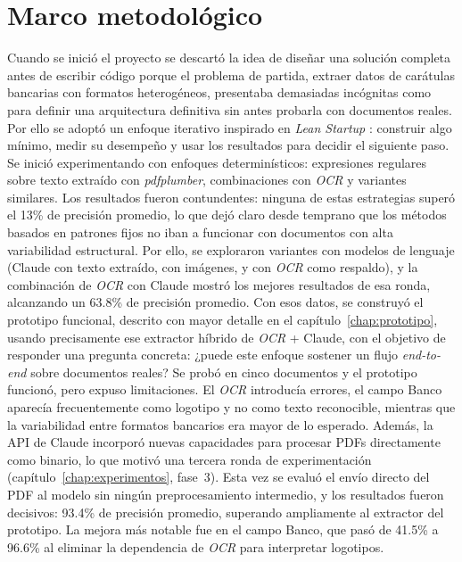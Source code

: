 \chapter{Marco metodológico}\label{chap:marco}

Cuando se inició el proyecto se descartó la idea de diseñar una solución completa antes de escribir código porque el problema de partida, extraer datos de carátulas bancarias con formatos heterogéneos, presentaba demasiadas incógnitas como para definir una arquitectura definitiva sin antes probarla con documentos reales. Por ello se adoptó un enfoque iterativo inspirado en \textit{Lean Startup} \cite{ries_lean_startup}: construir algo mínimo, medir su desempeño y usar los resultados para decidir el siguiente paso. Se inició experimentando con enfoques determinísticos: expresiones regulares sobre texto extraído con \textit{pdfplumber}, combinaciones con \textit{OCR} y variantes similares. Los resultados fueron contundentes: ninguna de estas estrategias superó el 13\% de precisión promedio, lo que dejó claro desde temprano que los métodos basados en patrones fijos no iban a funcionar con documentos con alta variabilidad estructural. Por ello, se exploraron variantes con modelos de lenguaje (Claude con texto extraído, con imágenes, y con \textit{OCR} como respaldo), y la combinación de \textit{OCR} con Claude mostró los mejores resultados de esa ronda, alcanzando un 63.8\% de precisión promedio. Con esos datos, se construyó el prototipo funcional, descrito con mayor detalle en el capítulo~\ref{chap:prototipo}, usando precisamente ese extractor híbrido de \textit{OCR} + Claude, con el objetivo de responder una pregunta concreta: ¿puede este enfoque sostener un flujo \textit{end-to-end} sobre documentos reales? Se probó en cinco documentos y el prototipo funcionó, pero expuso limitaciones. El \textit{OCR} introducía errores, el campo Banco aparecía frecuentemente como logotipo y no como texto reconocible, mientras que la variabilidad entre formatos bancarios era mayor de lo esperado. Además, la API de Claude incorporó nuevas capacidades para procesar PDFs directamente como binario, lo que motivó una tercera ronda de experimentación (capítulo~\ref{chap:experimentos}, fase~3). Esta vez se evaluó el envío directo del PDF al modelo sin ningún preprocesamiento intermedio, y los resultados fueron decisivos: 93.4\% de precisión promedio, superando ampliamente al extractor del prototipo. La mejora más notable fue en el campo Banco, que pasó de 41.5\% a 96.6\% al eliminar la dependencia de \textit{OCR} para interpretar logotipos.

